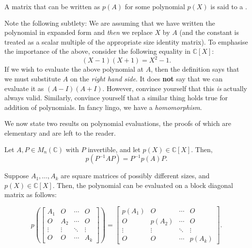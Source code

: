 \documentclass[12pt]{article}
\begin{document}
A matrix that can be written as $p(A)$ for some polynomial $p(X)$ is said to a .

Note the following subtlety: We are assuming that we have written the polynomial in expanded form and \emph{then} we replace $X$ by $A$ (and the constant is treated as a scalar multiple of the appropriate size identity matrix). \newline
To emphasise the importance of the above, consider the following equality in $\mathbb{C}[X]$:
\begin{equation*} 
	(X - 1)(X + 1) = X^{2} - 1.
\end{equation*}
If we wish to evaluate the above polynomial at $A$, then the definition says that we must substitute $A$ on the \emph{right hand side}. It does \textbf{not} say that we can evaluate it as $(A - I)(A + I)$. However, convince yourself that this \emph{is} actually always valid. Similarly, convince yourself that a similar thing holds true for addition of polynomials. \newline
In fancy lingo, we have a \emph{homomorphism}. 

We now state two results on polynomial evaluations, the proofs of which are elementary and are left to the reader.

\begin{thm} \label{thm:similar-polynomial-evaluation}
	Let $A, P \in M_{n}(\mathbb{C})$ with $P$ invertible, and let $p(X) \in \mathbb{C}[X]$. Then,
	\begin{equation*} 
		p(P^{-1} A P) = P^{-1} p(A) P.
	\end{equation*}
\end{thm}

\begin{thm} \label{thm:block-diagonal-polynomial}
	Suppose $A_{1}, \ldots, A_{k}$ are square matrices of possibly different sizes, and $p(X) \in \mathbb{C}[X]$. Then, the polynomial can be evaluated on a block diagonal matrix as follows:

	\begin{equation*} 
		p\left(\begin{bmatrix}
					A_{1} & O & \cdots & O \\
					O & A_{2} & \cdots & O \\
					\vdots & \vdots & \ddots & \vdots \\
					O & O & \cdots & A_{k}
				\end{bmatrix}\right)
		=
		\begin{bmatrix}
			p(A_{1}) & O & \cdots & O \\
			O & p(A_{2}) & \cdots & O \\
			\vdots & \vdots & \ddots & \vdots \\
			O & O & \cdots & p(A_{k})
		\end{bmatrix}.
	\end{equation*}
\end{thm}
\end{document}
